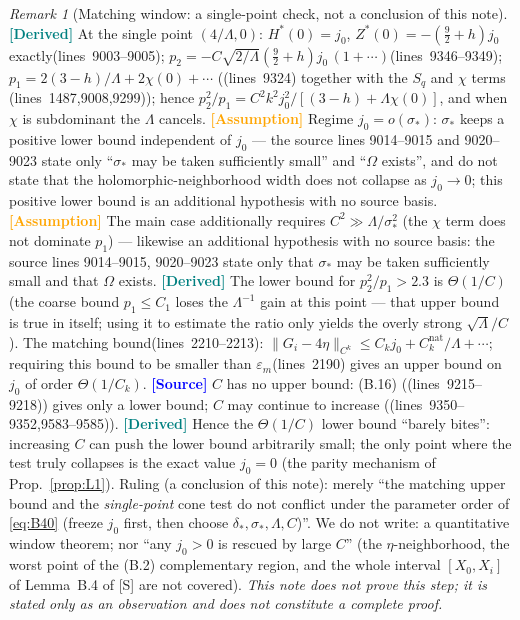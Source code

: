 \documentclass[11pt,a4paper]{article}
\theoremstyle{definition}
\theoremstyle{remark}
\newtheorem{remark}[theorem]{Remark}
\newcommand{\lnos}[1]{(lines~#1)}
\newcommand{\ORIG}{\textcolor{blue}{\textbf{[Source]}}}
\newcommand{\DER}{\textcolor{teal}{\textbf{[Derived]}}}
\newcommand{\HYP}{\textcolor{orange}{\textbf{[Assumption]}}}
\newcommand{\notproved}{\emph{This note does not prove this step; it is stated only as an observation
and does not constitute a complete proof.}}
\begin{document}
\begin{remark}[Matching window: a single-point check, not a conclusion of this note]
\label{rem:window}
\DER
At the single point $(4/\Lambda,0)$: $H^*(0)=j_0$, $Z^*(0)=-(\tfrac92+h)j_0$ exactly\lnos{9003--9005};
$p_2=-C\sqrt{2/\Lambda}(\tfrac92+h)j_0\,(1+\cdots)$\lnos{9346--9349};
$p_1=2(3-h)/\Lambda+2\chi(0)+\cdots$ (\lnos{9324} together with the $S_q$ and $\chi$ terms
\lnos{1487,9008,9299});
hence $p_2^2/p_1=C^2k^2j_0^2/[(3-h)+\Lambda\chi(0)]$, and when $\chi$ is subdominant the $\Lambda$
cancels.
\HYP
Regime $j_0=o(\sigma_*)$: $\sigma_*$ keeps a positive lower bound independent of $j_0$ --- the source
lines 9014--9015 and 9020--9023 state only ``$\sigma_*$ may be taken sufficiently small'' and ``$\Omega$
exists'', and do not state that the holomorphic-neighborhood width does not collapse as $j_0\to 0$; this
positive lower bound is an additional hypothesis with no source basis.
\HYP
The main case additionally requires $C^2\gg\Lambda/\sigma_*^2$ (the $\chi$ term does not dominate $p_1$)
--- likewise an additional hypothesis with no source basis: the source lines 9014--9015, 9020--9023 state
only that $\sigma_*$ may be taken sufficiently small and that $\Omega$ exists.
\DER
The lower bound for $p_2^2/p_1>2.3$ is $\Theta(1/C)$ (the coarse bound $p_1\le C_1$ loses the
$\Lambda^{-1}$ gain at this point --- that upper bound is true in itself; using it to estimate the ratio
only yields the overly strong $\sqrt{\Lambda}/C$).
The matching bound\lnos{2210--2213}:
$\|G_i-4\eta\|_{C^k}\le C_kj_0+C^{\mathrm{nat}}_k/\Lambda+\cdots$;
requiring this bound to be smaller than $\varepsilon_m$\lnos{2190} gives an upper bound on $j_0$ of order
$\Theta(1/C_k)$.
\ORIG
$C$ has no upper bound: (B.16) (\lnos{9215--9218}) gives only a lower bound; $C$ may continue to
increase (\lnos{9350--9352,9583--9585}).
\DER
Hence the $\Theta(1/C)$ lower bound ``barely bites'': increasing $C$ can push the lower bound
arbitrarily small; the only point where the test truly collapses is the exact value $j_0=0$
(the parity mechanism of Prop.~\ref{prop:L1}).
Ruling (a conclusion of this note): merely ``the matching upper bound and the \emph{single-point} cone
test do not conflict under the parameter order of \eqref{eq:B40} (freeze $j_0$ first, then choose
$\delta_*,\sigma_*,\Lambda,C$)''.
We do not write: a quantitative window theorem; nor ``any $j_0>0$ is rescued by large $C$''
(the $\eta$-neighborhood, the worst point of the (B.2) complementary region, and the whole interval
$[X_0,X_i]$ of Lemma~B.4 of [S] are not covered).
\notproved
\end{remark}
\end{document}
